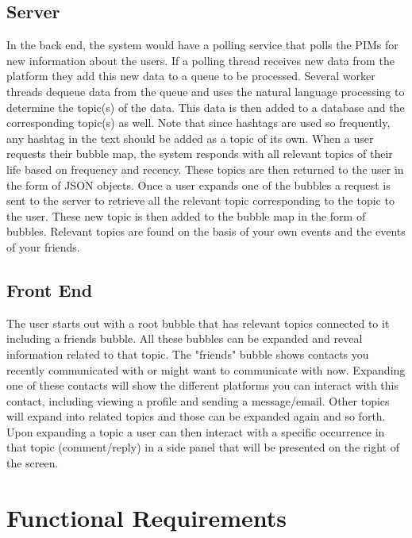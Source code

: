 \documentclass[hidelinks,english]{article}
\begin{document}
		\subsection{Server}
		In the back end, the system would have a polling service that polls the PIMs for new information about the users. If a polling thread receives new data from the platform they add this new data to a queue to be processed. Several worker threads dequeue data from the queue and uses the natural language processing to determine the topic(s) of the data. This data is then added to a database and the corresponding topic(s) as well. Note that since hashtags are used so frequently, any hashtag in the text should be added as a topic of its own. When a user requests their bubble map, the system responds with all relevant topics of their life based on frequency and recency. These topics are then returned to the user in the form of JSON objects. Once a user expands one of the bubbles a request is sent to the server to retrieve all the relevant topic corresponding to the topic to the user. These new topic is then added to the bubble map in the form of bubbles. Relevant topics are found on the basis of your own events and the events of your friends.
		
		\subsection{Front End}
		The user starts out with a root bubble that has relevant topics connected to it including a friends bubble. All these bubbles can be expanded and reveal information related to that topic. The "friends" bubble shows contacts you recently communicated with or might want to communicate with now. Expanding one of these contacts will show the different platforms you can interact with this contact, including viewing a profile and sending a message/email. Other topics will expand into related topics and those can be expanded again and so forth. Upon expanding a topic a user can then interact with a specific occurrence in that topic (comment/reply) in a side panel that will be presented on the right of the screen.
	
	\section{Functional Requirements}		
\end{document}
